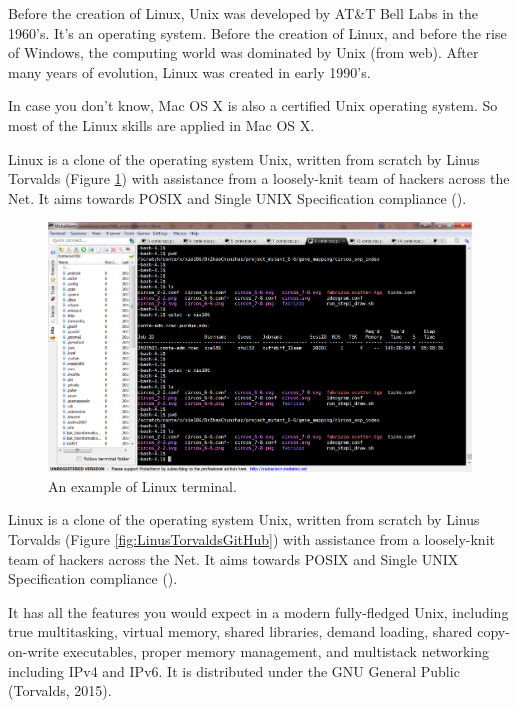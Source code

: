 \documentclass[]{book}
\theoremstyle{definition}
\theoremstyle{definition}
\theoremstyle{definition}
\theoremstyle{remark}
\begin{document}
Before the creation of Linux, Unix was developed by AT\&T Bell Labs in
the 1960's. It's an operating system. Before the creation of Linux, and
before the rise of Windows, the computing world was dominated by Unix
(from web). After many years of evolution, Linux was created in early
1990's.

In case you don't know, Mac OS X is also a certified Unix operating
system. So most of the Linux skills are applied in Mac OS X.

Linux is a clone of the operating system Unix, written from scratch by
Linus Torvalds (Figure \ref{fig:LinuxTerminal}) with assistance from a
loosely-knit team of hackers across the Net. It aims towards POSIX and
Single UNIX Specification compliance (\citet{Torvalds2015}).



\begin{figure}

{\centering \includegraphics[width=1\linewidth]{figures/linux_terminal_example} 

}

\caption{An example of Linux terminal.}\label{fig:LinuxTerminal}
\end{figure}

Linux is a clone of the operating system Unix, written from scratch by
Linus Torvalds (Figure \ref{fig:LinusTorvaldsGitHub}) with assistance
from a loosely-knit team of hackers across the Net. It aims towards
POSIX and Single UNIX Specification compliance (\citet{Torvalds2015}).

It has all the features you would expect in a modern fully-fledged Unix,
including true multitasking, virtual memory, shared libraries, demand
loading, shared copy-on-write executables, proper memory management, and
multistack networking including IPv4 and IPv6. It is distributed under
the GNU General Public (Torvalds, 2015).
\end{document}
